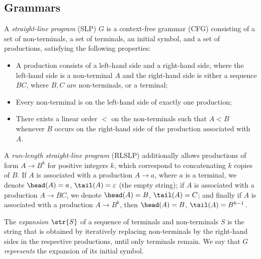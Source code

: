 \subsection{Grammars}
\begin{definition}
A \emph{straight-line program} (SLP) $G$ is a context-free grammar (CFG) consisting of a set of non-terminals, a set of terminals, an initial symbol, and a set of productions, satisfying the following properties:
\begin{itemize}
\item A production consists of a left-hand side and a right-hand side, where the left-hand side is a non-terminal $A$ and the right-hand side is either a sequence $BC$, where $B,C$ are non-terminals, or a terminal;
\item Every non-terminal is on the left-hand side of exactly one production;
\item There exists a linear order $<$ on the non-terminals such that $A < B$ whenever $B$ occurs on the right-hand side of the production associated with $A$.
\end{itemize}
\end{definition}

A \emph{run-length straight-line program} (RLSLP) \cite{mfcs/NishimotoIIBT16} additionally allows productions of form $A\rightarrow B^k$ for positive integers $k$, which correspond to concatenating $k$ copies of $B$. If $A$ is associated with a production $A \rightarrow a$, where $a$ is a terminal, we denote $\head(A) = a$, $\tail(A) = \varepsilon$ (the empty string); if $A$ is associated with a production $A \rightarrow BC$, we denote $\head(A) = B$, $\tail(A) = C$; and finally if $A$ is associated with a production $A \rightarrow B^k$, then $\head(A) = B$, $\tail(A) = B^{k-1}$.

The \emph{expansion} $\str{S}$ of a sequence of terminals and non-terminals $S$ is the string that is obtained by iteratively replacing non-terminals by the right-hand sides in the respective productions, until only terminals remain. We say that $G$ \emph{represents} the expansion of its initial symbol.

